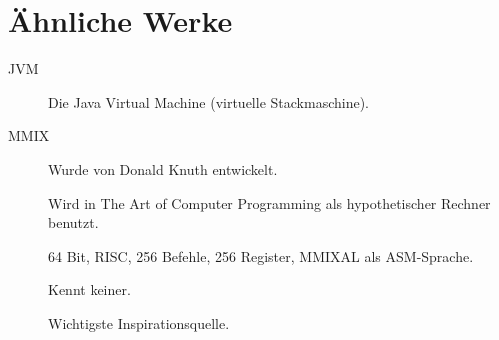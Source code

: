 \section{Ähnliche Werke}

\begin{frame}{\insertsection}
 \begin{description}
  \item[JVM]
    Die Java Virtual Machine (virtuelle Stackmaschine).
  \item[MMIX]
    Wurde von Donald Knuth entwickelt.
    
    Wird in \glqq The Art of Computer Programming\grqq{} als hypothetischer
    Rechner benutzt.

    64 Bit, RISC, 256 Befehle, 256 Register, MMIXAL als ASM-Sprache.
    
    Kennt keiner.
    
    Wichtigste Inspirationsquelle.
 \end{description}

\end{frame}




